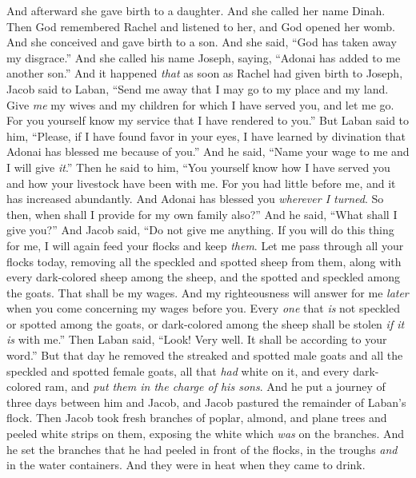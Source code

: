 \begin{biblechapter}
\verse And afterward she gave birth to a daughter. And she called her name Dinah.
\verse Then God remembered Rachel and listened to her, and God opened her womb.
\verse And she conceived and gave birth to a son. And she said, “God has taken away my disgrace.”
\verse And she called his name Joseph, saying, “Adonai has added to me another son.”
 And it happened \textit{that} as soon as Rachel had given birth to Joseph, Jacob said to Laban, “Send me away that I may go to my place and my land.
\verse Give \textit{me} my wives and my children for which I have served you, and let me go. For you yourself know my service that I have rendered to you.”
\verse But Laban said to him, “Please, if I have found favor in your eyes, I have learned by divination that Adonai has blessed me because of you.”
\verse And he said, “Name your wage to me and I will give \textit{it}.”
\verse Then he said to him, “You yourself know how I have served you and how your livestock have been with me.
\verse For you had little before me, and it has increased abundantly. And Adonai has blessed you \textit{wherever I turned}. So then, when shall I provide for my own family also?”
\verse And he said, “What shall I give you?” And Jacob said, “Do not give me anything. If you will do this thing for me, I will again feed your flocks and keep \textit{them}.
\verse Let me pass through all your flocks today, removing all the speckled and spotted sheep from them, along with every dark-colored sheep among the sheep, and the spotted and speckled among the goats. That shall be my wages.
\verse And my righteousness will answer for me \textit{later} when you come concerning my wages before you. Every \textit{one} that \textit{is} not speckled or spotted among the goats, or dark-colored among the sheep shall be stolen \textit{if it is} with me.”
\verse Then Laban said, “Look! Very well. It shall be according to your word.”
\verse But that day he removed the streaked and spotted male goats and all the speckled and spotted female goats, all that \textit{had} white on it, and every dark-colored ram, and \textit{put them in the charge of his sons}.
\verse And he put a journey of three days between him and Jacob, and Jacob pastured the remainder of Laban’s flock.
\verse Then Jacob took fresh branches of poplar, almond, and plane trees and peeled white strips on them, exposing the white which \textit{was} on the branches.
\verse And he set the branches that he had peeled in front of the flocks, in the troughs \textit{and} in the water containers. And they were in heat when they came to drink.

\end{biblechapter}
